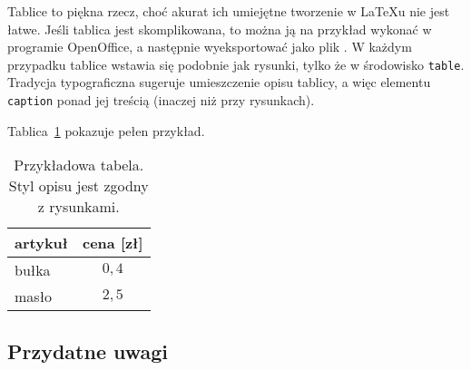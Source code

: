 Tablice to piękna rzecz, choć akurat ich umiejętne tworzenie w \LaTeX{}u nie jest łatwe. 
Jeśli tablica jest skomplikowana, to można ją na przykład wykonać w programie
OpenOffice, a następnie wyeksportować jako plik . W każdym przypadku tablice wstawia się podobnie
jak rysunki, tylko że w środowisko \texttt{table}. Tradycja typograficzna sugeruje umieszczenie opisu tablicy, a więc
elementu \texttt{caption} ponad jej treścią (inaczej niż przy rysunkach).  

Tablica~\ref{tab:tabela} pokazuje pełen przykład.

\begin{table}[ht]
\caption{Przykładowa tabela. Styl opisu jest zgodny z rysunkami.}\label{tab:tabela}
\centering\footnotesize%
\begin{tabular}{l c}
\toprule
artykuł & cena [zł] \\
\midrule
bułka   & $0,4$ \\
masło   & $2,5$ \\
\bottomrule
\end{tabular}
\end{table}


\subsection{Przydatne uwagi}

